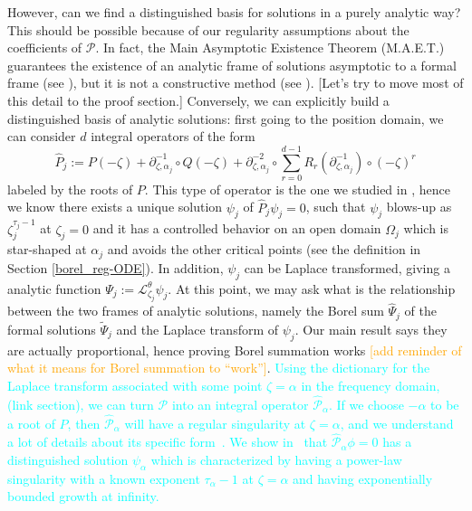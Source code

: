 \documentclass{article}
\newcommand{\series}[1]{\tilde{#1}}
\newcommand{\laplace}{\mathcal{L}}
\theoremstyle{definition}
\theoremstyle{plain}
\begin{document}
However, can we find a distinguished basis for solutions in a purely analytic way? This should be possible because of our regularity assumptions about the coefficients of $\mathcal{P}$. In fact, the Main Asymptotic Existence Theorem (M.A.E.T.) guarantees the existence of an analytic frame of solutions asymptotic to a formal frame (see \cite[Theorem 3.1]{diverg-resurg-iii}), but it is not a constructive method (see \cite[Chapter 14]{balser}). \color{black} \color{Goldenrod}[Let's try to move most of this detail to the proof section.] Conversely, we can explicitly build a distinguished basis of analytic solutions: first going to the position domain, we can consider $d$ integral operators of the form 
\begin{equation}
\hat{P}_j:=P(-\zeta)+\partial_{\zeta,\alpha_j}^{-1}\circ Q(-\zeta)+\partial_{\zeta,\alpha_j}^{-2}\circ\sum_{r=0}^{d-1}R_r(\partial_{\zeta,\alpha_j}^{-1})\circ (-\zeta)^r
\end{equation}
labeled by the roots of $P$. This type of operator is the one we studied in \cite{reg-sing-volterra}, hence we know there exists a unique solution $\psi_j$ of $\hat{P}_j\psi_j=0$, such that $\psi_j$ blows-up as $\zeta_j^{\tau_j-1}$ at $\zeta_j=0$ and it has a controlled behavior on an open domain $\Omega_j$ which is star-shaped at $\alpha_j$ and avoids the other critical points (see the definition in Section \ref{borel_reg-ODE}). In addition, $\psi_j$ can be Laplace transformed, giving a analytic function $\Psi_j:=\laplace_{\zeta_j}^{\theta}\psi_j$. 
At this point, we may ask what is the relationship between the two frames of analytic solutions, namely the Borel sum $\hat{\Psi}_j$ of the formal solutions $\series{\Psi}_j$ and the Laplace transform of $\psi_j$. Our main result says they are actually proportional, hence proving Borel summation works \textcolor{orange}{[add reminder of what it means for Borel summation to ``work'']}.\color{black}
\textcolor{Cyan}{Using the dictionary for the Laplace transform associated with some point $\zeta = \alpha$ in the frequency domain, (link section), we can turn $\mathcal{P}$ into an integral operator $\hat{\mathcal{P}}_\alpha$. If we choose $-\alpha$ to be a root of $P$, then $\hat{\mathcal{P}}_\alpha$ will have a regular singularity at $\zeta = \alpha$, and we understand a lot of details about its specific form~\cite{reg-sing-volterra}. We show in~\cite{reg-sing-volterra} that $\hat{\mathcal{P}}_\alpha \phi = 0$ has a distinguished solution $\psi_\alpha$ which is characterized by having a power-law singularity with a known exponent $\tau_\alpha - 1$ at $\zeta = \alpha$ and having exponentially bounded growth at infinity.}
\end{document}

